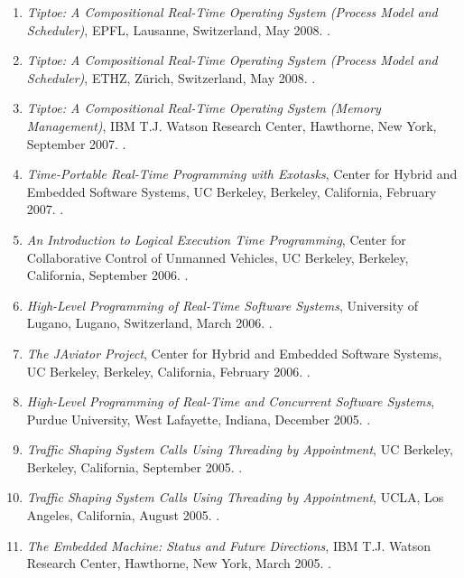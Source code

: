 {\begin{enumerate}
\item \emph{Tiptoe: A Compositional Real-Time Operating System (Process Model and Scheduler)},
EPFL, Lausanne, Switzerland, May 2008.
.

\item \emph{Tiptoe: A Compositional Real-Time Operating System (Process Model and Scheduler)},
ETHZ, Z{\"u}rich, Switzerland, May 2008.
.

\item \emph{Tiptoe: A Compositional Real-Time Operating System (Memory Management)},
IBM T.J. Watson Research Center, Hawthorne, New York, September 2007.
.

\item \emph{Time-Portable Real-Time Programming with Exotasks},
Center for Hybrid and Embedded Software Systems, UC Berkeley, Berkeley, California, February 2007.
.

\item \emph{An Introduction to Logical Execution Time Programming},
Center for Collaborative Control of Unmanned Vehicles, UC Berkeley, Berkeley, California, September 2006.
.

\item \emph{High-Level Programming of Real-Time Software Systems},
University of Lugano, Lugano, Switzerland, March 2006.
.

\item \emph{The JAviator Project},
Center for Hybrid and Embedded Software Systems, UC Berkeley, Berkeley, California, February 2006.
.

\item \emph{High-Level Programming of Real-Time and Concurrent Software Systems},
Purdue University, West Lafayette, Indiana, December 2005.
.

\item \emph{Traffic Shaping System Calls Using Threading by Appointment},
UC Berkeley, Berkeley, California, September 2005.
.

\item \emph{Traffic Shaping System Calls Using Threading by Appointment},
UCLA, Los Angeles, California, August 2005.
.

\item \emph{The Embedded Machine: Status and Future Directions},
IBM T.J. Watson Research Center, Hawthorne, New York, March 2005.
.


\end{enumerate}}
